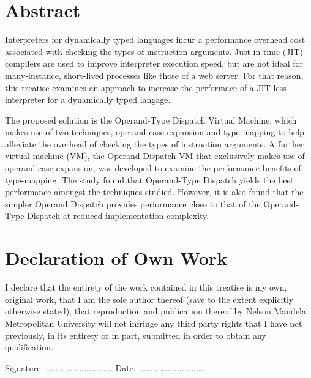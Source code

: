\documentclass[english,a4paper,12pt]{report}
\newcommand{\singleline}{\vspace*{1\baselineskip}}
\begin{document}
\newpage{}

\chapter*{Abstract}

Interpreters for dynamically typed languages incur a performance
overhead cost associated with checking the types of instruction
arguments. Just-in-time (JIT) compilers are used to improve interpreter
execution speed, but are not ideal for many-instance, short-lived
processes like those of a web server. For that reason, this treatise
examines an approach to increase the performace of a JIT-less
interpreter for a dynamically typed langage.

The proposed solution is the Operand-Type Dispatch Virtual Machine,
which makes use of two techniques, operand case expansion and
type-mapping to help alleviate the overhead of checking the types of
instruction arguments. A further virtual machine (VM), the Operand
Dispatch VM that exclusively makes use of operand case expansion, was
developed to examine the performance benefits of type-mapping. The
study found that Operand-Type Dispatch yields the best performance
amongst the techniques studied. However, it is also found that the
simpler Operand Dispatch provides performance close to that of the
Operand-Type Dispatch at reduced implementation complexity.


\newpage{}

\chapter*{Declaration of Own Work}
I declare that the entirety of the work contained in this treatise is
my own, original work, that I am the sole author thereof (save to the
extent explicitly otherwise stated), that reproduction and publication
thereof by Nelson Mandela Metropolitan University will not infringe
any third party rights that I have not previously, in its entirety or
in part, submitted in order to obtain any qualification.

\singleline
Signature: 	\tab............................\newline\newline
Date: 		\tab............................
\newpage{}

\listoffigures
\newpage{}

\listoftables
\newpage{}
\end{document}
